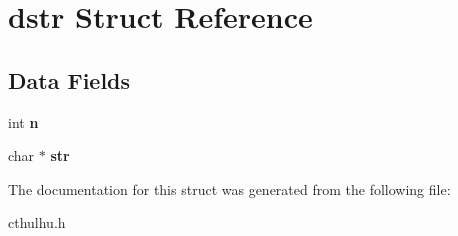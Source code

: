 \hypertarget{structdstr}{\section{dstr Struct Reference}
\label{structdstr}
}
\subsection*{Data Fields}
\begin{DoxyCompactItemize}
\item 
\hypertarget{structdstr_a6d7a6eb14de1711387424d0164b9dc8a}{int {\bfseries n}}\label{structdstr_a6d7a6eb14de1711387424d0164b9dc8a}

\item 
\hypertarget{structdstr_a6b360c5bb12052e95c8646ca2c0d5916}{char $\ast$ {\bfseries str}}\label{structdstr_a6b360c5bb12052e95c8646ca2c0d5916}

\end{DoxyCompactItemize}


The documentation for this struct was generated from the following file\-:\begin{DoxyCompactItemize}
\item 
cthulhu.\-h\end{DoxyCompactItemize}
